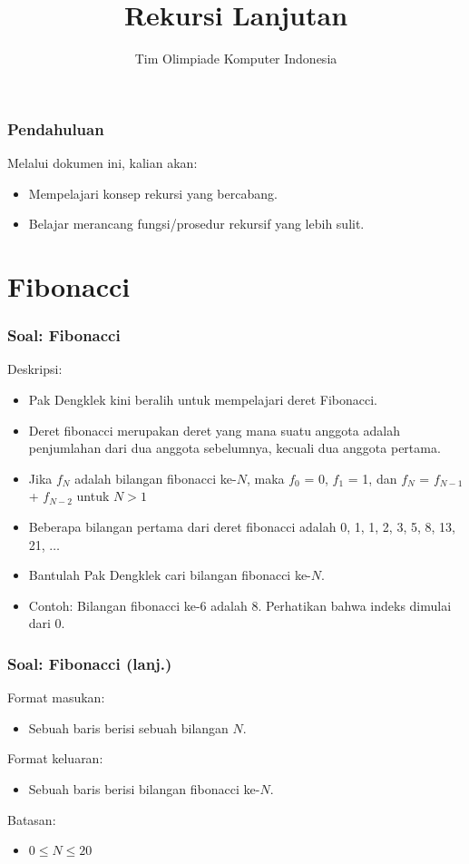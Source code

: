 

\title{Rekursi Lanjutan}
\author{Tim Olimpiade Komputer Indonesia}
\date{}



\begin{frame}
\titlepage
\end{frame}

\begin{frame}
\frametitle{Pendahuluan}
Melalui dokumen ini, kalian akan:
\begin{itemize}
  \item Mempelajari konsep rekursi yang bercabang.
  \item Belajar merancang fungsi/prosedur rekursif yang lebih sulit.
\end{itemize}
\end{frame}

\section{Fibonacci}
\frame{\sectionpage}

\begin{frame}
\frametitle{Soal: Fibonacci}
Deskripsi:
\begin{itemize}
  \item Pak Dengklek kini beralih untuk mempelajari deret Fibonacci.
  \item Deret fibonacci merupakan deret yang mana suatu anggota adalah penjumlahan dari dua anggota sebelumnya, kecuali dua anggota pertama.
  \item Jika $f_N$ adalah bilangan fibonacci ke-$N$, maka $f_0$ = 0, $f_1$ = 1, dan $f_N$ = $f_{N-1}$ + $f_{N-2}$ untuk $N > 1$
  \item Beberapa bilangan pertama dari deret fibonacci adalah 0, 1, 1, 2, 3, 5, 8, 13, 21, $\dots$
  \item Bantulah Pak Dengklek cari bilangan fibonacci ke-$N$.
  \item Contoh: Bilangan fibonacci ke-6 adalah 8. Perhatikan bahwa indeks dimulai dari 0.
\end{itemize}
\end{frame}

\begin{frame}
\frametitle{Soal: Fibonacci (lanj.) }
Format masukan:
\begin{itemize}
    \item Sebuah baris berisi sebuah bilangan $N$.
\end{itemize}
Format keluaran:
\begin{itemize}
    \item Sebuah baris berisi bilangan fibonacci ke-$N$.
\end{itemize}
Batasan:
\begin{itemize}
    \item $0 \le N \le 20$
\end{itemize}
\end{frame}

